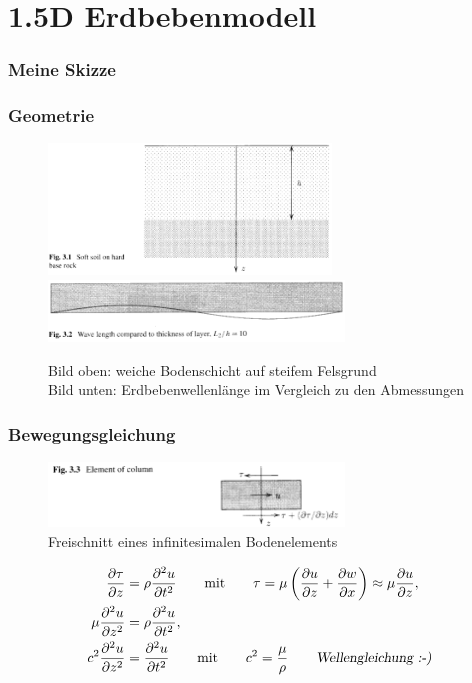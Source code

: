 \documentclass[hyperref={pdfpagemode=FullScreen, colorlinks=false}]{beamer}
\begin{document}
\section{1.5D Erdbebenmodell}

\begin{frame}
\frametitle{Meine Skizze}


\end{frame}

\begin{frame}
\frametitle{Geometrie}

\begin{figure}
\includegraphics[width=0.67\textwidth]{fig_pdf/earthquake_model}
\includegraphics[width=0.7\textwidth]{fig_pdf/earthquake_length_ratio}
\caption*{Bild oben: weiche Bodenschicht auf steifem Felsgrund\\ Bild unten: Erdbebenwellenlänge im Vergleich zu den Abmessungen \cite{Verruijt2010}}
\end{figure}
\end{frame}

\begin{frame}
\frametitle{Bewegungsgleichung}
\begin{figure}
\includegraphics[width=0.7\textwidth]{fig_pdf/earthquake_inf_element}
\caption*{Freischnitt eines infinitesimalen Bodenelements \cite{Verruijt2010}}
\end{figure}
\begin{align*}
 \frac{\partial \tau}{\partial z} &= \rho \frac{\partial^2 u}{\partial t^2}
 \qquad \text{mit} \qquad \tau=\mu \left(\frac{\partial u}{\partial z} +  \frac{\partial w}{\partial x} \right)\approx \mu \frac{\partial u}{\partial z},\\
 \mu \frac{\partial^2 u}{\partial z^2} &= \rho \frac{\partial^2 u}{\partial t^2},\\
 c^2\frac{\partial^2 u}{\partial z^2} &= \frac{\partial^2 u}{\partial t^2}
 \qquad \text{mit} \qquad c^2=\frac{\mu}{\rho}  \qquad \text{\textsl{Wellengleichung :-)}}
\end{align*}
\end{frame}
\end{document}

